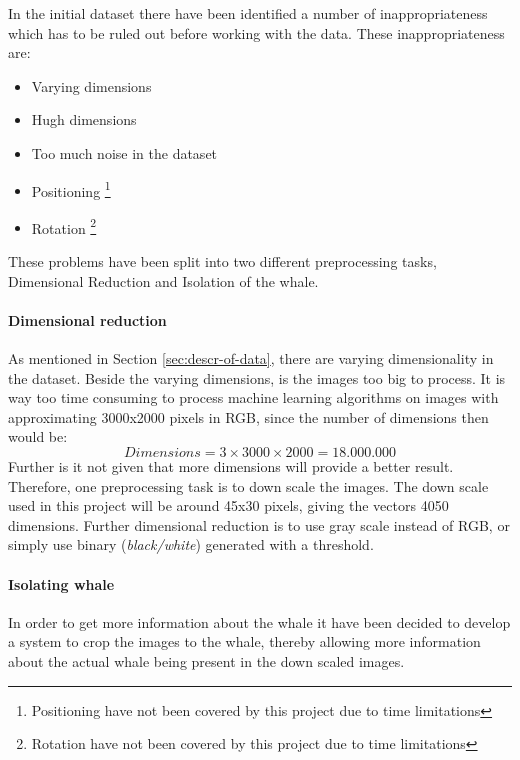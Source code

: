 In the initial dataset there have been identified a number of inappropriateness which has to be ruled out before working with the data.
These inappropriateness are:
\begin{itemize}
\item Varying dimensions
\item Hugh dimensions
\item Too much noise in the dataset
\item Positioning \footnote{Positioning have not been covered by this project due to time limitations}
\item Rotation \footnote{Rotation have not been covered by this project due to time limitations}
\end{itemize}
These problems have been split into two different preprocessing tasks, Dimensional Reduction and Isolation of the whale.

\paragraph{Dimensional reduction}
As mentioned in Section \ref{sec:descr-of-data}, there are varying dimensionality in the dataset. Beside the varying dimensions, is the images too big to process. It is way too time consuming to process machine learning algorithms on images with approximating 3000x2000 pixels in RGB, since the number of dimensions then would be:
\begin{equation}
Dimensions = 3 \times 3000 \times 2000=18.000.000
\end{equation} 
Further is it not given that more dimensions will provide a better result.
Therefore, one preprocessing task is to down scale the images.
The down scale used in this project will be around 45x30 pixels, giving the vectors 4050 dimensions.
Further dimensional reduction is to use gray scale instead of RGB, or simply use binary (\emph{black/white}) generated with a threshold.

\paragraph{Isolating whale}

In order to get more information about the whale it have been decided to develop a system to crop the images to the whale, thereby allowing more information about the actual whale being present in the down scaled images.

